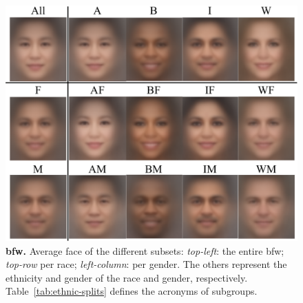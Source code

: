 \documentclass[10pt,twocolumn,letterpaper]{article}
\begin{document}





\begin{figure}[t!]
    \centering
    \includegraphics[width=.8\linewidth]{figures/montage.pdf}
    \caption{\small{\textbf{\gls{bfw}.} Average face of the different subsets: \emph{top-left}: the entire \gls{bfw}; \emph{top-row} per race;  \emph{left-column}: per gender. The others represent the ethnicity and gender of the race and gender, respectively. Table~\ref{tab:ethnic-splits} defines the acronyms of subgroups.}}
    \label{fig:avg-faces}
\end{figure}



\end{document}

